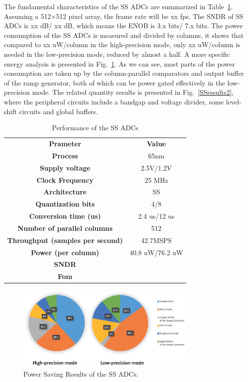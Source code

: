 \documentclass[conference]{IEEEtran}
\begin{document}
The fundamental characteristics of the SS ADCs are summarized in Table~\ref{tab1}. Assuming a 512×512 pixel array, the frame rate will be xx fps. The SNDR of SS ADCs is xx dB/ xx dB, which means the ENOB is 3.x bits/ 7.x bits. The power consumption of the SS ADCs is measured and divided by columns, it shows that compared to xx uW/column in the high-precision mode, only xx uW/column is needed in the low-precision mode, reduced by almost a half. A more specific energy analysis is presented in Fig.~\ref{SSresults1}. As we can see, most parts of the power consumption are taken up by the column-parallel comparators and output buffer of the ramp generator, both of which can be power gated effectively in the low-precision mode. The related quantity results is presented in Fig.~\ref{SSresults2}, where the peripheral circuits include a bandgap and voltage divider, some level-shift circuits and global buffers.
\begin{table}[htbp]
	\caption{Performance of the SS ADCs}
	\begin{center}
		\begin{tabular}{|c|c|}
			\hline
			\textbf{Prameter}& \textbf{Value} \\
			\hhline{|==|}
			\textbf{Process}& 65nm \\
			\hline 
		    \textbf{Supply voltage}& 2.5V/1.2V \\
		    \hline
		    \textbf{Clock Frequency}&	25 MHz \\
		    \hline
		    \textbf{Architecture}&	SS \\
		    \hline
		    \textbf{Quantization bits}&	4/8 \\
		    \hline
		    \textbf{Conversion time (us)}&	2.4 us/12 us \\
		    \hline
		    \textbf{Number of parallel columns}&	512 \\
		    \hline
		    \textbf{Throughput (samples per second)}&	42.7MSPS \\ 
		    \hline
		    \textbf{Power (per column)}&	40.8 uW/76.2 uW \\
		    \hline
		    \textbf{SNDR}& \\
		    \hline
		    \textbf{Fom}& \\
		    \hline	    
		\end{tabular}
		\label{tab1}
	\end{center}
\end{table}
\begin{figure}[htbp]
	\centerline{\includegraphics[width=3.5in]{./Figures/SSResults1.eps}}
	\caption{Power Saving Results of the SS ADCs.}
	\label{SSresults1}
\end{figure}
\end{document}
